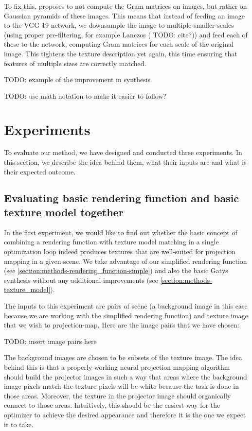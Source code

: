 To fix this, \citet{Snelgrove2017} proposes to not compute the Gram matrices on images, but rather on Gaussian pyramids of these images. This means that instead of feeding an image to the VGG-19 network, we downsample the image to multiple smaller scales (using proper pre-filtering, for example Lanczos ({\color{red} TODO: cite?})) and feed each of these to the network, computing Gram matrices for each scale of the original image. This tightens the texture description yet again, this time ensuring that features of multiple sizes are correctly matched.

{\color{red} TODO: example of the improvement in synthesis}

{\color{red} TODO: use math notation to make it easier to follow?}

\section{Experiments}
\label{section:methods-experiments}

To evaluate our method, we have designed and conducted three experiments. In this section, we describe the idea behind them, what their inputs are and what is their expected outcome.

\subsection{Evaluating basic rendering function and basic texture model together}
\label{section:methods-experiments-01}

In the first experiment, we would like to find out whether the basic concept of combining a rendering function with texture model matching in a single optimization loop indeed produces textures that are well-suited for projection mapping in a given scene. We take advantage of our simplified rendering function (see \ref{section:methods-rendering_function-simple}) and also the basic Gatys synthesis without any additional improvements (see \ref{section:methods-texture_model}).

The inputs to this experiment are pairs of scene (a background image in this case because we are working with the simplified rendering function) and texture image that we wish to projection-map. Here are the image pairs that we have chosen:

{\color{red} TODO: insert image pairs here}

The background images are chosen to be subsets of the texture image. The idea behind this is that a properly working neural projection mapping algorithm should build the projector images in such a way that areas where the background image pixels match the texture pixels will be white because the task is done in those areas. Moreover, the texture in the projector image should organically connect to those areas. Intuitively, this should be the easiest way for the optimizer to achieve the desired appearance and therefore it is the one we expect it to take.


